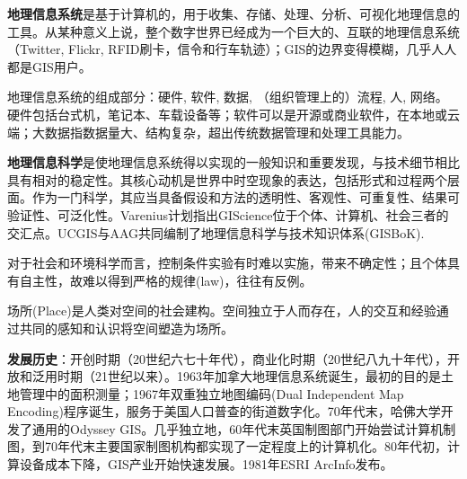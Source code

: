 \par \textbf{地理信息系统}是基于计算机的，用于收集、存储、处理、分析、可视化地理信息的工具。从某种意义上说，整个数字世界已经成为一个巨大的、互联的地理信息系统（Twitter, Flickr, RFID刷卡，信令和行车轨迹）；GIS的边界变得模糊，几乎人人都是GIS用户。

\par 地理信息系统的组成部分：硬件, 软件, 数据, （组织管理上的）流程, 人, 网络。硬件包括台式机，笔记本、车载设备等；软件可以是开源或商业软件，在本地或云端；大数据指数据量大、结构复杂，超出传统数据管理和处理工具能力。

\par \textbf{地理信息科学}是使地理信息系统得以实现的一般知识和重要发现，与技术细节相比具有相对的稳定性。其核心动机是世界中时空现象的表达，包括形式和过程两个层面。作为一门科学，其应当具备假设和方法的透明性、客观性、可重复性、结果可验证性、可泛化性。Varenius计划指出GIScience位于个体、计算机、社会三者的交汇点。UCGIS与AAG共同编制了地理信息科学与技术知识体系(GISBoK). 

\par 对于社会和环境科学而言，控制条件实验有时难以实施，带来不确定性；且个体具有自主性，故难以得到严格的规律(law)，往往有反例。

\par 场所(Place)是人类对空间的社会建构。空间独立于人而存在，人的交互和经验通过共同的感知和认识将空间塑造为场所。

\par \textbf{发展历史}：开创时期（20世纪六七十年代），商业化时期（20世纪八九十年代），开放和泛用时期（21世纪以来）。1963年加拿大地理信息系统诞生，最初的目的是土地管理中的面积测量；1967年双重独立地图编码(Dual Independent Map Encoding)程序诞生，服务于美国人口普查的街道数字化。70年代末，哈佛大学开发了通用的Odyssey GIS。几乎独立地，60年代末英国制图部门开始尝试计算机制图，到70年代末主要国家制图机构都实现了一定程度上的计算机化。80年代初，计算设备成本下降，GIS产业开始快速发展。1981年ESRI ArcInfo发布。

